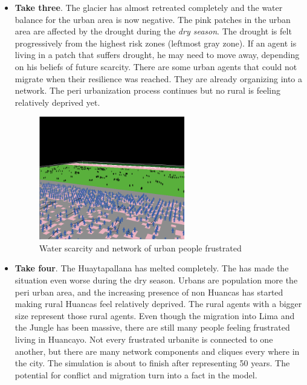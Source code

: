 \documentclass{article}
\begin{document}
\begin{itemize}
\item {\bf Take three}. The glacier has almost retreated completely and the water balance for the urban area is now negative. The pink patches in the urban area are affected by the drought during the \emph{dry season}. The drought is felt progressively from the highest risk zones (leftmost gray zone).  If an agent is living in a patch that suffers drought, he may need to move away, depending on his beliefs of future scarcity. There are some urban agents that could not migrate when their resilience was reached. They are already organizing into a network. The peri urbanization process continues but no rural is feeling relatively deprived yet.

\begin{figure}[h]
  \centering
  \includegraphics[width=0.6\textwidth]{esc3}
  \caption{Water scarcity and network of urban people frustrated}
  \label{esc3}
\end{figure}

\item {\bf Take four}. The Huaytapallana has melted completely. The has made the situation even worse during the dry season. Urbans are population more the peri urban area, and the increasing presence of non Huancas has started making rural Huancas feel relatively deprived. The rural agents with a bigger size represent those rural agents. Even though the migration into Lima and the Jungle has been massive, there are still many people feeling frustrated living in Huancayo. Not every frustrated urbanite is connected to one another, but there are many network components and cliques every where in the city. The simulation is about to finish after representing 50 years. The potential for conflict and migration turn into a fact in the model.


\end{itemize}
\end{document}
